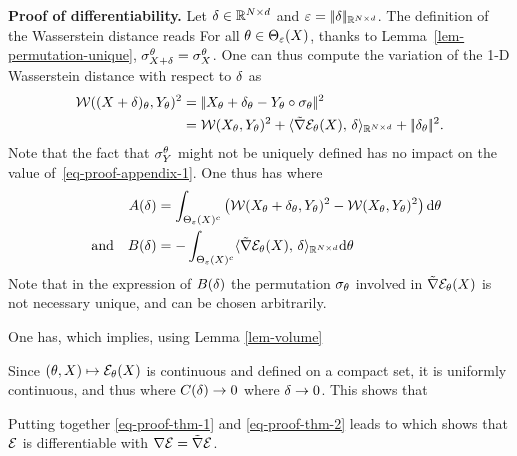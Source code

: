 \noindent\textbf{Proof of differentiability.}  Let $\delta \in \mathbb{R}^{N \times d}$ and $\varepsilon = |\!| \delta |\!|_{\mathbb{R}^{N \times d}}$. The definition of the Wasserstein distance reads
	For all $\theta \in \Theta_\varepsilon(X)$, thanks to Lemma~\ref{lem-permutation-unique}, 
	$\sigma_{X+\delta}^\theta = \sigma_{X}^\theta$.
	One can thus compute the variation of the 1-D Wasserstein distance with respect to $\delta$ as			
	\begin{align}
		\mathcal{W}((X+\delta)_\theta,Y_\theta)^2 &=
		|\!|  X_\theta+\delta_\theta - Y_\theta \circ \sigma_\theta  |\!|^2 \\
		\label{eq-proof-appendix-1} &= \mathcal{W}(X_\theta,Y_\theta)^2 + \langle  \tilde\nabla \mathcal{E}_\theta(X) ,\, \delta \rangle_{\mathbb{R}^{N \times d}} + |\!| \delta_\theta |\!|^2.
	\end{align}
	Note that the fact that $\sigma_Y^{\theta}$ might not be uniquely defined has no impact on the value of~\eqref{eq-proof-appendix-1}.
	One thus has 
	where
	\begin{align*}
		A(\delta) &= \int_{\Theta_\varepsilon(X)^c} \left( 			
			\mathcal{W}(X_\theta+\delta_\theta,Y_\theta)^2 - \mathcal{W}(X_\theta,Y_\theta)^2
		 \right) \mathrm{d} \theta \\
		\quad \text{and} \quad
		B(\delta) &= -\int_{\Theta_\varepsilon(X)^c} \langle  \tilde\nabla \mathcal{E}_\theta(X) ,\, \delta \rangle_{\mathbb{R}^{N \times d}} \mathrm{d} \theta 		
	\end{align*}
	Note that in the expression of $B(\delta)$ the permutation $\sigma_\theta$ involved in $\tilde\nabla \mathcal{E}_\theta(X)$ is not necessary unique, and can be chosen arbitrarily. 
	
	One has, 
	which implies, using Lemma \ref{lem-volume}
	
	Since $(\theta,X) \mapsto \mathcal{E}_\theta(X)$ is  continuous and defined on a compact set, 
	it is uniformly continuous, and thus 
	where $C(\delta) \rightarrow 0$ where $\delta \rightarrow 0$. This shows that
	
	Putting together \eqref{eq-proof-thm-1} and \eqref{eq-proof-thm-2} leads to 
	which shows that $\mathcal{E}$ is differentiable with $\nabla \mathcal{E} = \tilde\nabla \mathcal{E}$.
	
